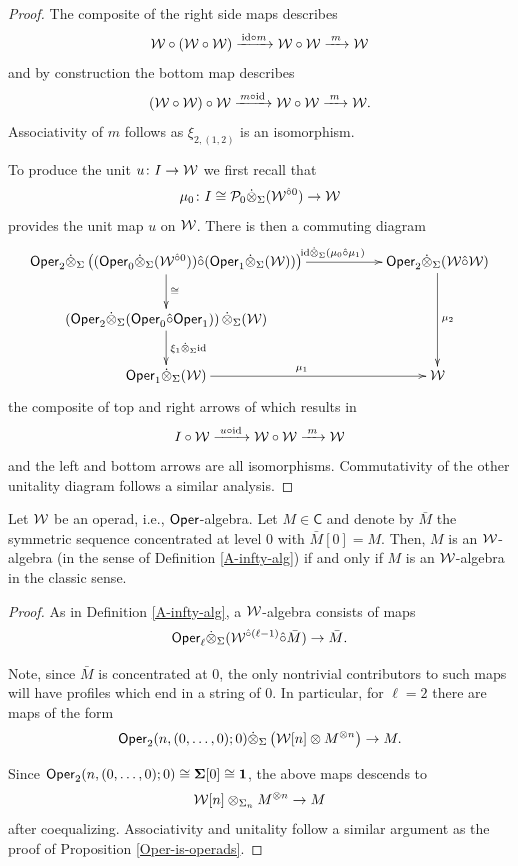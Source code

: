 \begin{proof}
The composite of the right side maps describes \[\mathcal{W}\circ (\mathcal{W}\circ \mathcal{W})\xrightarrow{\, \mathrm{id}\circ m\,} \mathcal{W}\circ \mathcal{W} \xrightarrow{\; m\;} \mathcal{W}\] and by construction the bottom map describes \[(\mathcal{W}\circ \mathcal{W})\circ \mathcal{W} \xrightarrow{\, m\circ \mathrm{id}\,} \mathcal{W}\circ \mathcal{W} \xrightarrow{\; m\;} \mathcal{W}.\] Associativity of $m$ follows as $\xi_{2,(1,2)}$ is an isomorphism. 

To produce the unit $u\colon I\to \mathcal{W}$ we first recall that \[\mu_0\colon I\cong \mathcal{P}_0\dot{\otimes}_{\Sigma}  (\mathcal{W}^{\hat{\circ} 0}) \to \mathcal{W}\] provides the unit map $u$ on $\mathcal{W}$. There is then a commuting diagram \begin{equation*}
        \xymatrix{
            \Oper_2 \tensordot_{\Sigma}  \left( (\Oper_0\tensordot_{\Sigma}  (\Cal{W}^{\circhat 0})) \circhat (\Oper_1\tensordot_{\Sigma}  (\Cal{W})) \right) \ar[rr]^<(.2){\id\tensordot_{\Sigma} (\mu_0 \circhat \mu_1)} \ar[d]^{\cong}
            &&
            \Oper_2\tensordot_{\Sigma}  (\Cal{W} \circhat \Cal{W}) \ar[dd]^{\mu_2}
            \\
            \left( \Oper_2 \tensordot_{\Sigma}  (\Oper_0\circhat \Oper_1) \right) \tensordot_{\Sigma}  (\Cal{W}) \ar[d]^{\xi_1\tensordot_{\Sigma} \id}
            &&
            \\
            \Oper_1 \tensordot_{\Sigma} ( \Cal{W}) \ar[rr]^{\mu_1}
            &&
            \Cal{W}}
    \end{equation*} the composite of top and right arrows of which results in \[I\circ \mathcal{W}\xrightarrow{\;u \circ \mathrm{id}\;} \mathcal{W}\circ \mathcal{W} \xrightarrow{\;m\;} \mathcal{W}\] and the left and bottom arrows are all isomorphisms. Commutativity of the other unitality diagram follows a similar analysis.
\end{proof} 

\begin{corollary}
\label{oper-oper}
    Let $\mathcal{W}$ be an operad, i.e., $\mathsf{Oper}$-algebra. Let $M\in \mathsf{C}$ and denote by $\bar{M}$ the symmetric sequence concentrated at level $0$ with $\bar{M}[0]=M$. Then, $M$ is an $\mathcal{W}$-algebra (in the sense of Definition \ref{A-infty-alg}) if and only if $M$ is an $\mathcal{W}$-algebra in the classic sense. 
\end{corollary}

\begin{proof}
    As in Definition \ref{A-infty-alg}, a $\mathcal{W}$-algebra consists of maps \[\mathsf{Oper}_{\ell} \dot{\otimes}_{\Sigma}  (\mathcal{W}^{\hat{\circ} (\ell-1)} \hat{\circ} \bar{M})\to \bar{M}.\] 
    
    Note, since $\bar{M}$ is concentrated at $0$, the only nontrivial contributors to such maps will have profiles which end in a string of $0$. In particular, for $\ell=2$ there are maps of the form \[\mathsf{Oper}_2(n,(0,\dots,0);0)\dot{\otimes}_{\Sigma}  \left( \mathcal{W}[n] \otimes M^{\otimes n}\right)\to M.\] 
    
    Since $\mathsf{Oper}_2(n,(0,\dots,0);0)\cong \mathbf{\Sigma}[0]\cong \mathbf{1}$, the above maps descends to \[\mathcal{W}[n]\otimes_{\Sigma_n} M^{\otimes n} \to M\] after coequalizing. Associativity and unitality follow a similar argument as the proof of Proposition \ref{Oper-is-operads}.
\end{proof}


